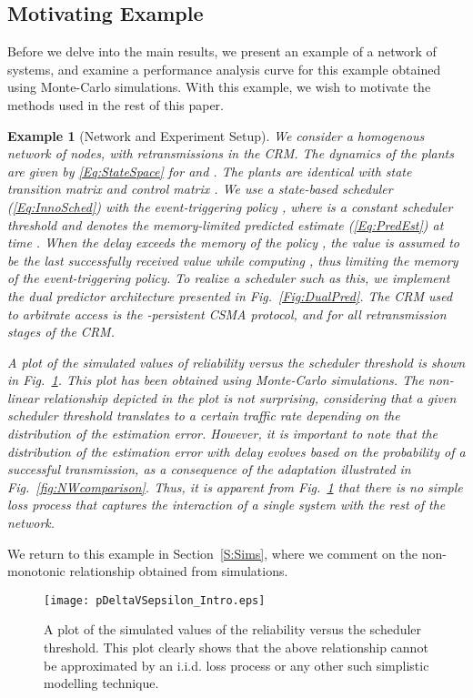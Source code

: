 \documentclass[journal]{IEEEtran}
\newtheorem{example}{Example}[section]
\begin{document}
\subsection{Motivating Example}
Before we delve into the main results, we present an example of a network of systems, and examine a performance analysis curve for this example obtained using Monte-Carlo simulations. With this example, we wish to motivate the methods used in the rest of this paper.
\begin{example}[Network and Experiment Setup] \label{Ex:Setup}
We consider a homogenous network of  nodes, with  retransmissions in the CRM. The dynamics of the plants are given by \eqref{Eq:StateSpace} for  and . The plants are identical with state transition matrix  and control matrix . We use a state-based scheduler (\ref{Eq:InnoSched}) with the event-triggering policy , where  is a constant scheduler threshold and  denotes the memory-limited predicted estimate (\ref{Eq:PredEst}) at time . When the delay exceeds the memory of the policy , the value  is assumed to be the last successfully received value while computing , thus limiting the memory of the event-triggering policy. To realize a scheduler such as this, we implement the dual predictor architecture presented in Fig.~\ref{Fig:DualPred}. The CRM used to arbitrate access is the -persistent CSMA protocol, and  for all  retransmission stages of the CRM.

A plot of the simulated values of reliability  versus the scheduler threshold  is shown in Fig.~\ref{Fig:pDeltaVSepsilonTeaser}. This plot has been obtained using Monte-Carlo simulations. The non-linear relationship depicted in the plot is not surprising, considering that a given scheduler threshold translates to a certain traffic rate depending on the distribution of the estimation error. However, it is important to note that the distribution of the estimation error with delay evolves based on the probability of a successful transmission, as a consequence of the adaptation illustrated in Fig.~\ref{fig:NWcomparison}. Thus, it is apparent from Fig.~\ref{Fig:pDeltaVSepsilonTeaser} that there is no simple loss process that captures the interaction of a single system with the rest of the network.
\end{example}

We return to this example in Section~\ref{S:Sims}, where we comment on the non-monotonic relationship obtained from simulations.
\begin{figure}[tb]
\begin{center}
\texttt{[image: pDeltaVSepsilon\_Intro.eps]}
\caption{A plot of the simulated values of the reliability versus the scheduler threshold. This plot clearly shows that the above relationship cannot be approximated by an i.i.d. loss process or any other such simplistic modelling technique. } \label{Fig:pDeltaVSepsilonTeaser}
\end{center}
\vspace{-5mm}
\end{figure}
\end{document}
